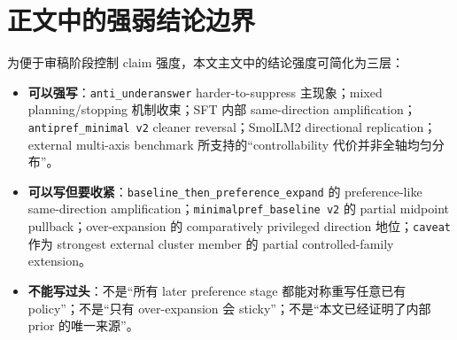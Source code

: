\documentclass[12pt]{ctexart}
\begin{document}
\section{正文中的强弱结论边界}

为便于审稿阶段控制 claim 强度，本文主文中的结论强度可简化为三层：
\begin{itemize}[leftmargin=1.5em]
  \item \textbf{可以强写}：\texttt{anti\_underanswer} harder-to-suppress 主现象；mixed planning/stopping 机制收束；SFT 内部 same-direction amplification；\texttt{anti\rightarrow pref\_minimal v2} cleaner reversal；SmolLM2 directional replication；external multi-axis benchmark 所支持的“controllability 代价并非全轴均匀分布”。
  \item \textbf{可以写但要收紧}：\texttt{baseline\_then\_preference\_expand} 的 preference-like same-direction amplification；\texttt{minimal\rightarrow pref\_baseline v2} 的 partial midpoint pullback；over-expansion 的 comparatively privileged direction 地位；\texttt{caveat} 作为 strongest external cluster member 的 partial controlled-family extension。
  \item \textbf{不能写过头}：不是“所有 later preference stage 都能对称重写任意已有 policy”；不是“只有 over-expansion 会 sticky”；不是“本文已经证明了内部 prior 的唯一来源”。
\end{itemize}



\end{document}
